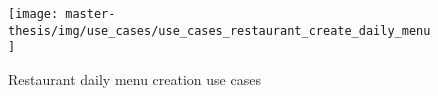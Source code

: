 \begin{figure}[h]
  \centering
  \texttt{[image: master-thesis/img/use\_cases/use\_cases\_restaurant\_create\_daily\_menu]}
  \caption{Restaurant daily menu creation use cases}
\end{figure}


























